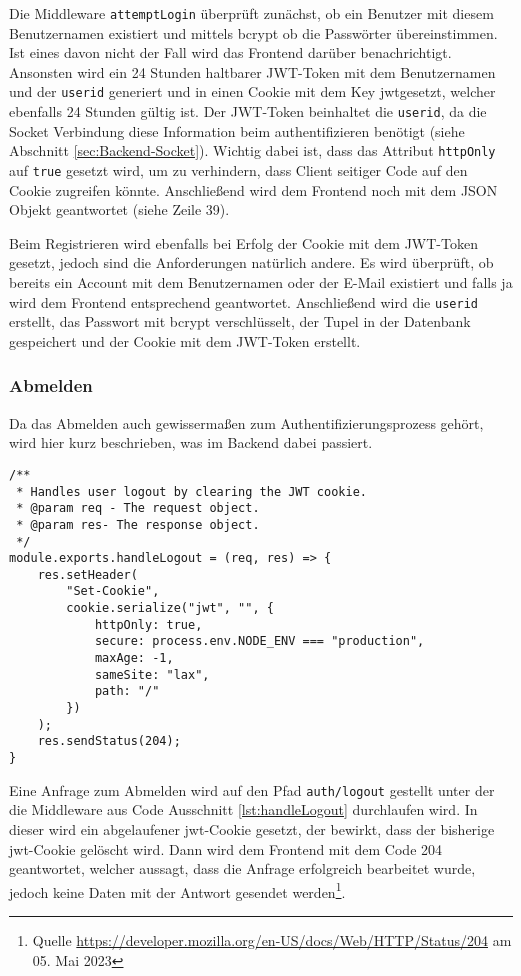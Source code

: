 Die Middleware \verb|attemptLogin| überprüft zunächst, ob ein Benutzer mit diesem Benutzernamen existiert und mittels bcrypt ob die Passwörter übereinstimmen. Ist eines davon nicht der Fall wird das Frontend darüber benachrichtigt. Ansonsten wird ein 24 Stunden haltbarer JWT-Token mit dem Benutzernamen und der \verb|userid| generiert und in einen Cookie mit dem Key \glqq jwt\grqq{ }gesetzt, welcher ebenfalls 24 Stunden gültig ist. Der JWT-Token beinhaltet die \verb|userid|, da die Socket Verbindung diese Information beim authentifizieren benötigt (siehe Abschnitt \ref{sec:Backend-Socket}).  Wichtig dabei ist, dass das Attribut \verb|httpOnly| auf \verb|true| gesetzt wird, um zu verhindern, dass Client seitiger Code auf den Cookie zugreifen könnte. Anschließend wird dem Frontend noch mit dem JSON Objekt geantwortet (siehe Zeile 39).

Beim Registrieren wird ebenfalls bei Erfolg der Cookie mit dem JWT-Token gesetzt, jedoch sind die Anforderungen natürlich andere. Es wird überprüft, ob bereits ein Account mit dem Benutzernamen oder der E-Mail existiert und falls ja wird dem Frontend entsprechend geantwortet. Anschließend wird die \verb|userid| erstellt, das Passwort mit bcrypt verschlüsselt, der Tupel in der Datenbank gespeichert und der Cookie mit dem JWT-Token erstellt.

\subsubsection{Abmelden}
Da das Abmelden auch gewissermaßen zum Authentifizierungsprozess gehört, wird hier kurz beschrieben, was im Backend dabei passiert.

\begin{lstlisting}[style=codeStyle, caption={Middleware zum Abmelden}, label={lst:handleLogout}]
/**
 * Handles user logout by clearing the JWT cookie.
 * @param req - The request object.
 * @param res- The response object.
 */
module.exports.handleLogout = (req, res) => {
    res.setHeader(
        "Set-Cookie",
        cookie.serialize("jwt", "", {
            httpOnly: true,
            secure: process.env.NODE_ENV === "production",
            maxAge: -1,
            sameSite: "lax",
            path: "/"
        })
    );
    res.sendStatus(204);
}
\end{lstlisting}

Eine Anfrage zum Abmelden wird auf den Pfad \verb|auth/logout| gestellt unter der die Middleware aus Code Ausschnitt \ref{lst:handleLogout} durchlaufen wird. In dieser wird ein abgelaufener \glqq jwt\grqq  -Cookie gesetzt, der bewirkt, dass der bisherige \glqq jwt\grqq -Cookie gelöscht wird. Dann wird dem Frontend mit dem Code 204 geantwortet, welcher aussagt, dass die Anfrage erfolgreich bearbeitet wurde, jedoch keine Daten mit der Antwort gesendet werden\footnote{Quelle \url{https://developer.mozilla.org/en-US/docs/Web/HTTP/Status/204} am 05. Mai 2023}.

